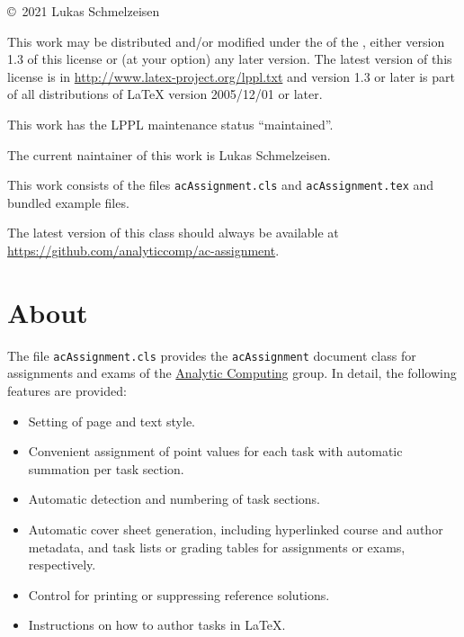 \documentclass{acAssignment}
\begin{document}
\maketitle

\begin{multicols}{2}
    \tableofcontents
\end{multicols}

\vfill

\copyright~2021 Lukas Schmelzeisen

This work may be distributed and/or modified under the of the , either version 1.3 of this license or (at your option) any later version.
The latest version of this license is in \url{http://www.latex-project.org/lppl.txt} and version 1.3 or later is part of all distributions of LaTeX version 2005/12/01 or later.

This work has the LPPL maintenance status ``maintained''.

The current naintainer of this work is Lukas Schmelzeisen.

This work consists of the files \texttt{acAssignment.cls} and \texttt{acAssignment.tex} and bundled example files.

{\hfuzz=31pt
The latest version of this class should always be available at \url{https://github.com/analyticcomp/ac-assignment}.
\par}


\section{About}
\label{sec:about}

The file \texttt{acAssignment.cls} provides the \texttt{acAssignment} document class for assignments and exams of the \href{https://www.ipvs.uni-stuttgart.de/departments/ac/}{Analytic Computing} group.
In detail, the following features are provided:

\begin{itemize}
    \item Setting of page and text style.
    \item Convenient assignment of point values for each task with automatic summation per task section.
    \item Automatic detection and numbering of task sections.
    \item Automatic cover sheet generation, including hyperlinked course and author metadata, and task lists or grading tables for assignments or exams, respectively.
    \item Control for printing or suppressing reference solutions.
    \item Instructions on how to author tasks in \LaTeX.
\end{itemize}
\end{document}
